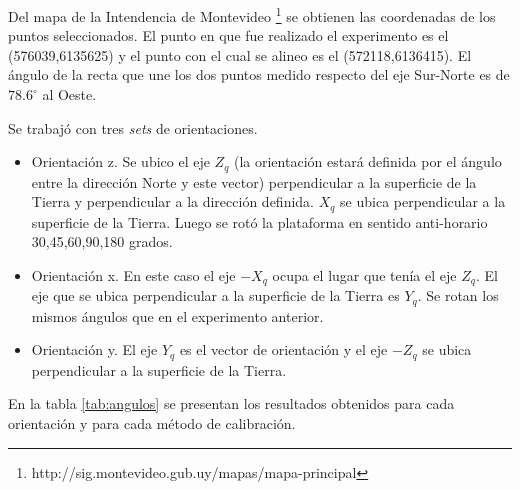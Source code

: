 \documentclass[main]{subfiles}
\begin{document}
Del mapa de la Intendencia de Montevideo \footnote{http://sig.montevideo.gub.uy/mapas/mapa-principal} se obtienen las coordenadas de los puntos seleccionados. El punto en que fue realizado el experimento es el (576039,6135625) y el punto con el cual se alineo es el (572118,6136415). El ángulo de la recta que une los dos puntos medido respecto del eje Sur-Norte es de $78.6^\circ$ al Oeste.

Se trabajó con tres \emph{sets} de orientaciones. 
\begin{itemize}
\item Orientación z. Se ubico el eje $Z_q$ (la orientación estará definida por el ángulo entre la dirección Norte y este vector) perpendicular a la superficie de la Tierra y perpendicular a la dirección definida. $X_q$ se ubica perpendicular a la superficie de la Tierra.  Luego se rotó la plataforma en sentido anti-horario 30,45,60,90,180 grados. 
\item Orientación x. En este caso el eje $-X_q$ ocupa el lugar que  tenía el eje $Z_q$. El eje que se ubica perpendicular a la superficie de la Tierra es $Y_q$. Se rotan los mismos ángulos que en el experimento anterior.
\item Orientación y. El eje $Y_q$ es el vector de orientación y el eje $-Z_q$ se ubica perpendicular a la superficie de la Tierra. 
\end{itemize} 


En la tabla \ref{tab:angulos} se presentan los resultados obtenidos para cada orientación y para cada método de calibración. 
\end{document}
